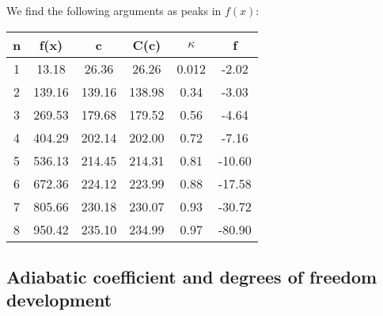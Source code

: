 \documentclass[../main.tex]{subfiles}
\begin{document}
        We find the following arguments as peaks in $f(x)$:
        \begin{table}[H]
            \centering
            \begin{tabular}{c|c|c|c|c|c}
                n & f(x)    & c       & C(c)    & $\kappa$ & f\\
                \hline
                1 & 13.18   & 26.36   & 26.26   & 0.012 & -2.02 \\
                2 & 139.16  & 139.16  & 138.98  & 0.34  & -3.03  \\
                3 & 269.53  & 179.68  & 179.52  & 0.56  & -4.64  \\
                4 & 404.29  & 202.14  & 202.00  & 0.72  & -7.16  \\
                5 & 536.13  & 214.45  & 214.31  & 0.81  & -10.60 \\
                6 & 672.36  & 224.12  & 223.99  & 0.88  & -17.58 \\
                7 & 805.66  & 230.18  & 230.07  & 0.93  & -30.72 \\
                8 & 950.42  & 235.10  & 234.99  & 0.97  & -80.90
            \end{tabular}
        \end{table}

        



    \subsection*{Adiabatic coefficient and degrees of freedom development}
        
        

        
        
\end{document}
